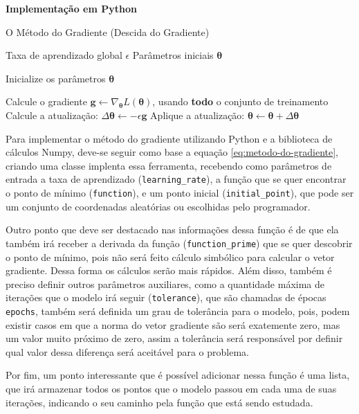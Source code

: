 \textbf{Implementação em Python}

\begin{algorithm}[H]
\caption{O Método do Gradiente (Descida do Gradiente)}
\label{alg:gradient_descent}
\begin{algorithmic}[1]
\Require Taxa de aprendizado global $\epsilon$
\Require Parâmetros iniciais $\boldsymbol{\theta}$

\State Inicialize os parâmetros $\boldsymbol{\theta}$

    \State Calcule o gradiente $\mathbf{g} \gets \nabla_{\boldsymbol{\theta}} L(\boldsymbol{\theta})$, usando \textbf{todo} o conjunto de treinamento
    \State Calcule a atualização: $\Delta \boldsymbol{\theta} \gets -\epsilon \mathbf{g}$
    \State Aplique a atualização: $\boldsymbol{\theta} \gets \boldsymbol{\theta} + \Delta \boldsymbol{\theta}$
\EndWhile
\end{algorithmic}
\end{algorithm}

Para implementar o método do gradiente utilizando Python e a biblioteca de cálculos Numpy, deve-se seguir como base a equação \ref{eq:metodo-do-gradiente}, criando uma classe implenta essa ferramenta, recebendo como parâmetros de entrada a taxa de aprendizado (\texttt{learning\_rate}), a função que se quer encontrar o ponto de mínimo (\texttt{function}), e um ponto inicial (\texttt{initial\_point}), que pode ser um conjunto de coordenadas aleatórias ou escolhidas pelo programador.

Outro ponto que deve ser destacado nas informações dessa função é de que ela também irá receber a derivada da função (\texttt{function\_prime}) que se quer descobrir o ponto de mínimo, pois não será feito cálculo simbólico para calcular o vetor gradiente. Dessa forma os cálculos serão mais rápidos. Além disso, também é preciso definir outros parâmetros auxiliares, como a quantidade máxima de iterações que o modelo irá seguir (\texttt{tolerance}), que são chamadas de épocas \texttt{epochs}, também será definida um grau de tolerância para o modelo, pois, podem existir casos em que a norma do vetor gradiente são será exatemente zero, mas um valor muito próximo de zero, assim a tolerância será responsável por definir qual valor dessa diferença será aceitável para o problema.

Por fim, um ponto interessante que é possível adicionar nessa função é uma lista, que irá armazenar todos os pontos que o modelo passou em cada uma de suas iterações, indicando o seu caminho pela função que está sendo estudada.

